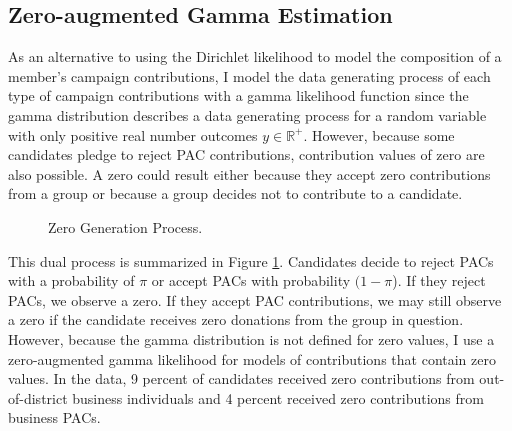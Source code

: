 \documentclass[12pt]{article}
\begin{document}
\begin{appendices}
\doublespacing
\setcounter{table}{0}
\renewcommand{\thetable}{A\arabic{table}}

\section{Zero-augmented Gamma Estimation} \label{sec: zip model}

As an alternative to using the Dirichlet likelihood to model the composition of a member's campaign contributions, I model the data generating process of each type of campaign contributions with a gamma likelihood function since the gamma distribution describes a data generating process for a random variable with only positive real number outcomes $y \in  \mathbb{R}^+$. However, because some candidates pledge to reject PAC contributions, contribution values of zero are also possible. A zero could result either because they accept zero contributions from a group or because a group decides not to contribute to a candidate. 

\begin{figure}[!htb]
    \centering
    \footnotesize
    \caption{Zero Generation Process.}
    \label{fig: zero process}
\end{figure}

This dual process is summarized in Figure \ref{fig: zero process}. Candidates decide to reject PACs with a probability of $\pi$ or accept PACs with probability $(1 - \pi$). If they reject PACs, we observe a zero. If they accept PAC contributions, we may still observe a zero if the candidate receives zero donations from the group in question. However, because the gamma distribution is not defined for zero values, I use a zero-augmented gamma likelihood for models of contributions that contain zero values. In the data, 9 percent of candidates received zero contributions from out-of-district business individuals and 4 percent received zero contributions from business PACs.


\end{appendices}
\end{document}
